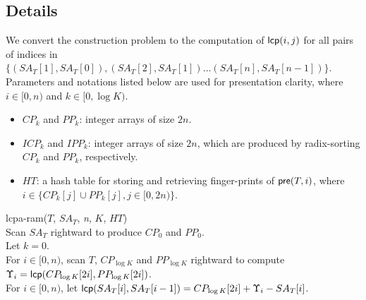 \documentclass{llncs}
\begin{document}
\subsection{Details}\label{subsec:implementation_in_ram}

We convert the construction problem to the computation of ${\sf lcp}(i,j)$ for all pairs of indices in $\{(SA_T[1], SA_T[0]),(SA_T[2], SA_T[1])\ldots (SA_T[n], SA_T[n-1])\}$. Parameters and notations listed below are used for presentation clarity, where $i\in [0,n)$ and $k\in [0,\log K)$.

\begin{itemize}
\item $CP_k$ and $PP_k$: integer arrays of size $2n$.
\item $ICP_k$ and $IPP_k$: integer arrays of size $2n$, which are produced by radix-sorting $CP_k$ and $PP_k$, respectively.
\item $HT$: a hash table for storing and retrieving finger-prints of ${\sf pre}(T,i)$, where $i\in \{CP_k[j] \cup PP_k[j], j\in[0,2n)\}$.
\end{itemize}

\begin{algorithm}[hbtp!]
\caption{Compute $K$-Order $LCPA_T$ in RAM}
\label{fig:alg:ram}
lcpa-ram($T$, $SA_T$, {\em n}, $K$, $HT$){\\
\SetAlgoNoLine
Scan $SA_T$ rightward to produce $CP_0$ and $PP_0$. \\
Let $k = 0$. \\
\While{$k < \log K$}{
\Indentp{-1em}
Radix-sort $CP_k$ and $PP_k$ to produce $ICP_k$ and $IPP_k$. \\
For $i\in [0,n)$, scan $T$ rightward to compute the finger-print of ${\sf pre}(T,i)$ and let $FP[0,i]=HT[i]$ if $i\in \{ICP_k[j] \cup IPP_k[j], j\in[0,2n)\}$. \\
For $i\in [0,n)$, scan $CP_k$ and $PP_k$ rightward to compute and compare $FP[CP_k[2i]+1,CP_k[2i+1]]$ and $FP[PP_k[2i]+1,PP_k[2i+1]]$ for generating $CP_{k+1}$ and $PP_{k+1}$. \\
Let $k = k +1$ and clear $HT$. \\
}
For $i\in [0,n)$, scan $T$, $CP_{\log K}$ and $PP_{\log K}$ rightward to compute $\Upsilon_i = {\sf lcp}(CP_{\log K}[2i],PP_{\log K}[2i])$. \\
For $i\in [0,n)$, let ${\sf lcp}(SA_T[i],SA_T[i-1])=CP_{\log K}[2i] +\Upsilon_i-SA_T[i]$. \\
}
\end{algorithm}
\end{document}
